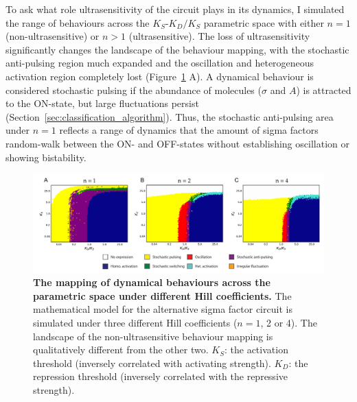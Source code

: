 To ask what role ultrasensitivity of the circuit plays in its dynamics,
I simulated the range of behaviours across the $K_S$-$K_D/K_S$ 
parametric space with either $n = 1$ (non-ultrasensitive) or
$n > 1$ (ultrasensitive).
The loss of ultrasensitivity significantly changes the landscape
of the behaviour mapping,
with the stochastic anti-pulsing region much expanded and
the oscillation and heterogeneous activation
region completely lost (Figure~\ref{fig:behaviour_mappings_diff_n} A).
A dynamical behaviour is considered stochastic pulsing if 
the abundance of molecules ($\sigma$ and $A$) is attracted to the
ON-state, but large fluctuations persist
(Section~\ref{sec:classification_algorithm}).
Thus, the stochastic anti-pulsing area under $n = 1$ reflects
a range of dynamics that the amount of sigma factors random-walk 
between the ON- and OFF-states without establishing oscillation
or showing bistability.

\begin{figure}[ht]
    \centering
    \includegraphics[width = 6in]{behaviour_mappings_diff_n.pdf}
    \caption[
        The mapping of dynamical behaviours across the parametric
        space under different Hill coefficients
        ]{
        \textbf{The mapping of dynamical behaviours across the parametric
        space under different Hill coefficients.} 
        The mathematical model for the alternative sigma factor circuit
        is simulated under three different Hill coefficients
        ($n = 1$, 2 or 4).
        The landscape of the non-ultrasensitive behaviour mapping is
        qualitatively different from the other two.
        $K_S$: the activation threshold (inversely correlated with
        activating strength). $K_D$: the repression threshold (inversely
        correlated with the repressive strength).
    }
    \label{fig:behaviour_mappings_diff_n}
\end{figure}

